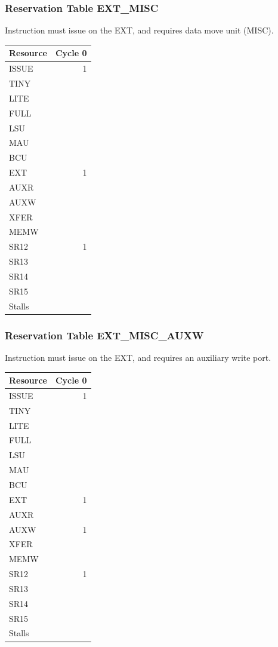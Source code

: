 \subsubsection{Reservation Table EXT\_MISC} \label{sec:reservation-EXT-MISC}

Instruction must issue on the EXT, and requires data move unit (MISC).
\medskip

\begin{tabular}{|l|r|} \hline
Resource	& Cycle 0 \\ \hline
\textsf{ISSUE}	& 1	\\
\textsf{TINY}	& 	\\
\textsf{LITE}	& 	\\
\textsf{FULL}	& 	\\
\textsf{LSU}	& 	\\
\textsf{MAU}	& 	\\
\textsf{BCU}	& 	\\
\textsf{EXT}	& 1	\\
\textsf{AUXR}	& 	\\
\textsf{AUXW}	& 	\\
\textsf{XFER}	& 	\\
\textsf{MEMW}	& 	\\
\textsf{SR12}	& 1	\\
\textsf{SR13}	& 	\\
\textsf{SR14}	& 	\\
\textsf{SR15}	& 	\\
\hline Stalls	& 	\\
\hline \end{tabular}

\subsubsection{Reservation Table EXT\_MISC\_AUXW} \label{sec:reservation-EXT-MISC-AUXW}

Instruction must issue on the EXT, and requires an auxiliary write port.
\medskip

\begin{tabular}{|l|r|} \hline
Resource	& Cycle 0 \\ \hline
\textsf{ISSUE}	& 1	\\
\textsf{TINY}	& 	\\
\textsf{LITE}	& 	\\
\textsf{FULL}	& 	\\
\textsf{LSU}	& 	\\
\textsf{MAU}	& 	\\
\textsf{BCU}	& 	\\
\textsf{EXT}	& 1	\\
\textsf{AUXR}	& 	\\
\textsf{AUXW}	& 1	\\
\textsf{XFER}	& 	\\
\textsf{MEMW}	& 	\\
\textsf{SR12}	& 1	\\
\textsf{SR13}	& 	\\
\textsf{SR14}	& 	\\
\textsf{SR15}	& 	\\
\hline Stalls	& 	\\
\hline \end{tabular}

